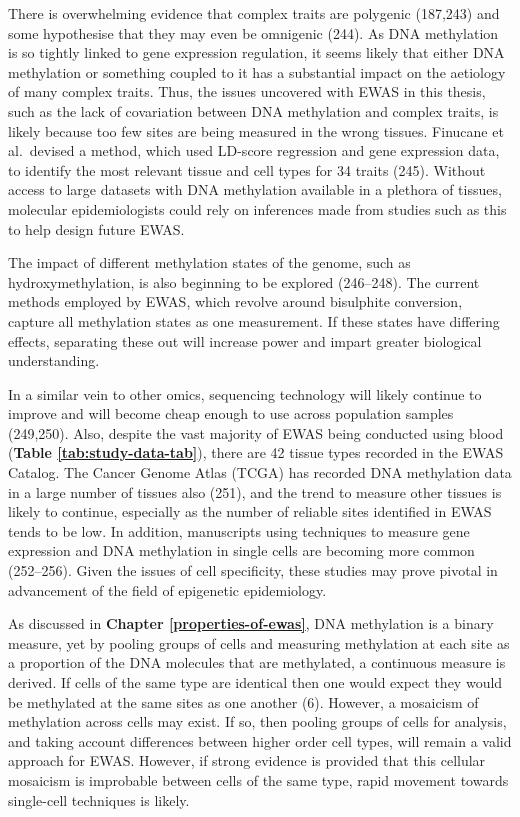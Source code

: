 \documentclass[11pt,oneside]{bristolthesis}
\begin{document}
There is overwhelming evidence that complex traits are polygenic (187,243) and some hypothesise that they may even be omnigenic (244). As DNA methylation is so tightly linked to gene expression regulation, it seems likely that either DNA methylation or something coupled to it has a substantial impact on the aetiology of many complex traits. Thus, the issues uncovered with EWAS in this thesis, such as the lack of covariation between DNA methylation and complex traits, is likely because too few sites are being measured in the wrong tissues. Finucane et al.~devised a method, which used LD-score regression and gene expression data, to identify the most relevant tissue and cell types for 34 traits (245). Without access to large datasets with DNA methylation available in a plethora of tissues, molecular epidemiologists could rely on inferences made from studies such as this to help design future EWAS.

The impact of different methylation states of the genome, such as hydroxymethylation, is also beginning to be explored (246--248). The current methods employed by EWAS, which revolve around bisulphite conversion, capture all methylation states as one measurement. If these states have differing effects, separating these out will increase power and impart greater biological understanding.

In a similar vein to other omics, sequencing technology will likely continue to improve and will become cheap enough to use across population samples (249,250). Also, despite the vast majority of EWAS being conducted using blood (\textbf{Table \ref{tab:study-data-tab}}), there are 42 tissue types recorded in the EWAS Catalog. The Cancer Genome Atlas (TCGA) has recorded DNA methylation data in a large number of tissues also (251), and the trend to measure other tissues is likely to continue, especially as the number of reliable sites identified in EWAS tends to be low. In addition, manuscripts using techniques to measure gene expression and DNA methylation in single cells are becoming more common (252--256). Given the issues of cell specificity, these studies may prove pivotal in advancement of the field of epigenetic epidemiology.

As discussed in \textbf{Chapter \ref{properties-of-ewas}}, DNA methylation is a binary measure, yet by pooling groups of cells and measuring methylation at each site as a proportion of the DNA molecules that are methylated, a continuous measure is derived. If cells of the same type are identical then one would expect they would be methylated at the same sites as one another (6). However, a mosaicism of methylation across cells may exist. If so, then pooling groups of cells for analysis, and taking account differences between higher order cell types, will remain a valid approach for EWAS. However, if strong evidence is provided that this cellular mosaicism is improbable between cells of the same type, rapid movement towards single-cell techniques is likely.
\end{document}

